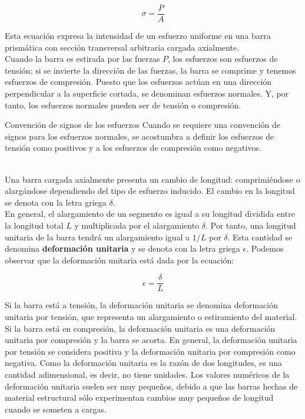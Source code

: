 \documentclass[12pt,letterpaper]{article}
\begin{document}
\begin{equation}
\sigma = \frac{P}{A}
\end{equation}

Esta ecuación expresa la intensidad de un esfuerzo uniforme en una barra prismática con sección transversal arbitraria 
cargada axialmente.\\

Cuando la barra es estirada por las fuerzas $P$, los esfuerzos son esfuerzos de tensión; si se invierte la dirección 
de las fuerzas, la barra se comprime y tenemos esfuerzos de compresión. Puesto que los esfuerzos actúan en una 
dirección perpendicular a la superficie cortada, se denominan esfuerzos normales. Y, por tanto, los esfuerzos normales 
pueden ser de tensión o compresión.\\

\begin{informacion}{Convención de signos de los esfuerzos}
Cuando se requiere una convención de signos para los esfuerzos normales, se acostumbra a definir los esfuerzos de tensión 
como positivos y a los esfuerzos de compresión como negativos.
\end{informacion} \hfill \\

Una barra cargada axialmente presenta un cambio de longitud: comprimiéndose o alargándose dependiendo del tipo 
de esfuerzo inducido. El cambio en la longitud se denota con la letra griega $\delta$.\\

En general, el alargamiento de un segmento es igual a su longitud dividida entre la longitud total $L$ y multiplicada 
por el alargamiento $\delta$. Por tanto, una longitud unitaria de la barra tendrá un alargamiento igual a $1/L$ por 
$\delta$. Esta cantidad se denomina \textbf{deformación unitaria} y se denota con la letra griega $\epsilon$. Podemos 
observar que la deformación unitaria está dada por la ecuación:

\begin{equation}
\epsilon = \frac{\delta}{L}
\end{equation}

Si la barra está a tensión, la deformación unitaria se denomina deformación unitaria por tensión, que representa 
un alargamiento o estiramiento del material. Si la barra está en compresión, la deformación unitaria es una deformación 
unitaria por compresión y la barra se acorta. En general, la deformación unitaria por tensión se considera positiva 
y la deformación unitaria por compresión como negativa. Como la deformación unitaria es la razón de dos longitudes, es 
una cantidad adimensional, es decir, no tiene unidades. Los valores numéricos de la deformación 
unitaria suelen ser muy pequeños, debido a que las barras hechas de material estructural sólo experimentan cambios 
muy pequeños de longitud cuando se someten a cargas. \\
\end{document}
